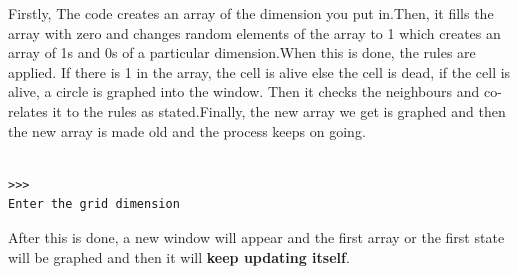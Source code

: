 \documentclass{tufte-handout}
\begin{document}
Firstly, The code creates an array of the dimension you put in.Then, it fills the array with zero and changes random elements of the array to 1 which creates an array of 1s and 0s of a particular dimension.When this is done, the rules are applied. If there is 1 in the array, the cell is alive else the cell is dead, if the cell is alive, a circle is graphed into the window. Then it checks the neighbours and co-relates it to the rules as stated.Finally, the new array we get is graphed and then the new array is made old and the process keeps on going.


\begin{shaded}
\begin{verbatim}

>>>
Enter the grid dimension 

\end{verbatim}
\end{shaded}

After this is done, a new window will appear and the first array or the first state will be graphed and then it will {\textbf{keep updating itself}}.



\end{document}

